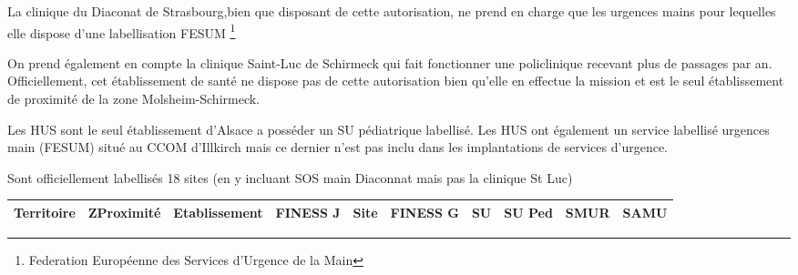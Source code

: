 \documentclass[12pt,english,french,twoside]{report}\usepackage[]{graphicx}\usepackage[]{color}
\begin{document}
La clinique du Diaconat de Strasbourg,bien que disposant de cette autorisation, ne prend en charge que les urgences mains pour lequelles elle dispose d'une labellisation FESUM \footnote{Federation Européenne des Services d'Urgence de la Main}

On prend également en compte la clinique Saint-Luc de Schirmeck qui fait fonctionner une policlinique recevant plus de  passages par an. Officiellement, cet établissement de santé ne dispose pas de cette autorisation bien qu'elle en effectue la mission et est le seul établissement de proximité de la zone Molsheim-Schirmeck.

Les HUS sont le seul établissement d'Alsace a posséder un SU pédiatrique labellisé. Les HUS ont également un service labellisé urgences main (FESUM) situé au CCOM d'Illkirch mais ce dernier n'est pas inclu dans les implantations de services d'urgence.

Sont officiellement labellisés 18 sites (en y incluant SOS main Diaconnat mais pas la clinique St Luc)

\begin{tabular}{|c|c|c|c|c|c|c|c|c|c|}
\hline 
Territoire & ZProximité & Etablissement & FINESS J & Site & FINESS G & SU & SU Ped & SMUR & SAMU\tabularnewline
\hline 
\hline 
\hline 
\end{tabular}
\end{document}
